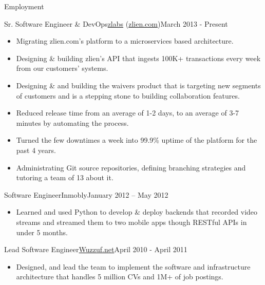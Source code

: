 \documentclass[]{mosabcv}
\begin{document}
	\makeheader
	
	
	\begin{cvsection}{Employment}
		\begin{cvsubsection}{Sr. Software Engineer \& DevOps}{\href{http://zla.bs}{zlabs} (\href{http://www.zlien.com}{zlien.com})}{March 2013 - Present}
		\begin{itemize}
				\item Migrating zlien.com's platform to a microservices based architecture.
				\item Designing \& building zlien's API that ingests 100K+ transactions every week from our customers' systems.
				\item Designing \& and building the waivers product that is targeting new segments of customers and is a stepping stone to building collaboration features.
				\item Reduced release time from an average of 1-2 days, to an average of 3-7 minutes by automating the process.
				\item Turned the few downtimes a week into 99.9\% uptime of the platform for the past 4 years.
				\item Administrating Git source repositories, defining branching strategies and tutoring a team of 13 about it.
			\end{itemize}
		\end{cvsubsection}
		
		\begin{cvsubsection}{Software Engineer}{Inmobly}{January 2012 – May 2012}		
			\begin{itemize}
				\item Learned and used Python to develop \& deploy backends that recorded video streams and streamed them to two mobile apps though RESTful APIs in under 5 months.
			\end{itemize}
		\end{cvsubsection}
		
		\begin{cvsubsection}{Lead Software Engineer}{\href{http://www.wuzzuf.net}{Wuzzuf.net}}{April 2010 - April 2011}			
			\begin{itemize}
				\item Designed, and lead the team to implement the software and infrastructure architecture that handles 5 million CVs and 1M+ of job postings.
			\end{itemize}
		\end{cvsubsection}
	

\end{cvsection}
\end{document}
